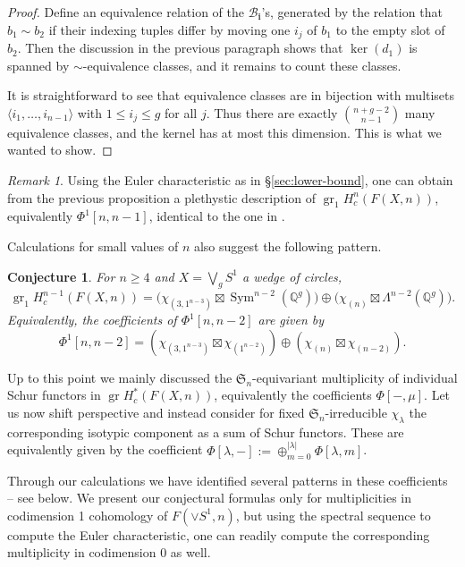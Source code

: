 \documentclass[12pt]{article}
\newcommand{\Q}{\mathbb{Q}}
\newcommand{\SymGroup}[1][n]{\mathfrak{S}_{#1}}
\newcommand{\Specht}[1]{\chi_{#1}}
\newcommand{\TransposePartition}[1]{{#1}^{\ast}}
\DeclareMathOperator{\gr}{gr}
\DeclareMathOperator{\Sym}{Sym}
\theoremstyle{plain}
\newtheorem{conj}[thm]{Conjecture}
\theoremstyle{definition}
\theoremstyle{remark}
\newtheorem{rmk}[thm]{Remark}
\begin{document}
\begin{proof}
    Define an equivalence relation of the $\mathcal{B}_{\mathbf{i}}$'s, generated by the relation that $b_1\sim b_2$ if their indexing tuples differ by moving one $i_j$ of $b_1$ to the empty slot of $b_2$. Then the discussion in the previous paragraph shows that $\ker(d_1)$ is spanned by $\sim$-equivalence classes, and it remains to count these classes.
    
    It is straightforward to see that equivalence classes are in bijection with multisets $\langle i_1,\ldots,i_{n-1}\rangle$ with $1\leq i_j \leq g$ for all $j$. Thus there are exactly $\binom{n+g-2}{n-1}$ many equivalence classes, and the kernel has at most this dimension. This is what we wanted to show.
\end{proof}

\begin{rmk}
    Using the Euler characteristic as in \S\ref{sec:lower-bound}, one can obtain from the previous proposition a plethystic description of $\gr_1 H^n_c(F(X,n))$, equivalently $\Phi^1[n, n-1]$, identical to the one in \cite[Corollary 3]{PV18}.
\end{rmk}

Calculations for small values of $n$ also suggest the following pattern.
\begin{conj}
    For $n\geq 4$ and $X = \bigvee_g S^1$ a wedge of circles,
    \[
        \gr_1 H_c^{n-1}(F(X,n)) = \big(\Specht{(3,1^{n-3})}\boxtimes \Sym^{n-2}(\Q^g) \big) \oplus \big( \Specht{(n)}\boxtimes \Lambda^{n-2}(\Q^g)\big).
    \]
    Equivalently, the coefficients of $\Phi^1[n, n-2]$ are given by
    \begin{equation}
        \Phi^1[n, n-2] = (\Specht{(3, 1^{n-3})}\boxtimes \Specht{(1^{n-2})}) \oplus (\Specht{(n)}\boxtimes \Specht{(n-2)}).
    \end{equation}
\end{conj}

Up to this point we mainly discussed the $\SymGroup$-equivariant multiplicity of individual Schur functors in $\gr H^*_c(F(X,n))$, equivalently the coefficients $\Phi[-,\mu]$. Let us now shift perspective and instead consider for fixed $\SymGroup$-irreducible $\Specht{\lambda}$ the corresponding isotypic component as a sum of Schur functors. %
These are equivalently given by the coefficient $\Phi[\lambda, -]:= \oplus_{m=0}^{|\lambda|}\Phi[\lambda,m]$.

Through our calculations we have identified several patterns in these coefficients -- see below. We present our conjectural formulas only for multiplicities in codimension 1 cohomology of $F(\vee S^1,n)$, but using the spectral sequence to compute the Euler characteristic, one can readily compute the corresponding multiplicity in codimension 0 as well.
\end{document}

